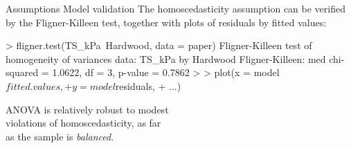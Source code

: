 \documentclass[t]{beamer}
\begin{document}
\begin{ftstf}
{Assumptions}
{Model validation}
The homoscedasticity assumption can be verified by the Fligner-Killeen test, together with plots of residuals by fitted values:
\begin{rcode}
> fligner.test(TS_kPa~Hardwood, data = paper)
Fligner-Killeen test of homogeneity of
variances
data:  TS_kPa by Hardwood
Fligner-Killeen:
med chi-squared = 1.0622, df = 3, 
p-value = 0.7862
>
> plot(x = model$fitted.values,
+ y = model$residuals, 
+ ...)
\end{rcode}
\vhalf
ANOVA is relatively robust to modest\\
violations of homoscedasticity, as far\\
as the sample is \textit{balanced}.
\end{ftstf}

\end{document}
